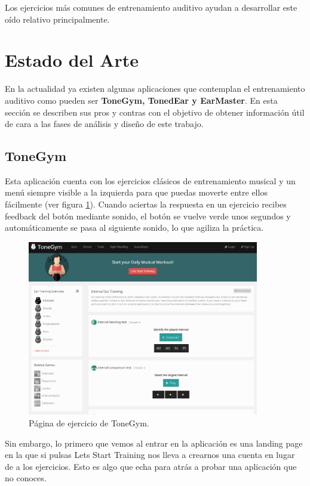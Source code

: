 \documentclass[12pt,twoside,titlepage]{report}
\begin{document}
Los ejercicios más comunes de entrenamiento auditivo ayudan a desarrollar este oído relativo principalmente.

\section{Estado del Arte}

En la actualidad ya existen algunas aplicaciones que contemplan el entrenamiento auditivo como pueden ser \textbf{ToneGym, TonedEar y EarMaster}. En esta sección se describen sus pros y contras con el objetivo de obtener información útil de cara a las fases de análisis y diseño de este trabajo.

\subsection{ToneGym}

Esta aplicación cuenta con los ejercicios clásicos de entrenamiento musical y un menú siempre visible a la izquierda para que puedas moverte entre ellos fácilmente (ver figura \ref{fig:ToneGym}). Cuando aciertas la respuesta en un ejercicio recibes feedback del botón mediante sonido, el botón se vuelve verde unos segundos y automáticamente se pasa al siguiente sonido, lo que agiliza la práctica.

\begin{figure}[H] 
    \includegraphics[width=0.9\textwidth]{Estado del Arte/tonegym}
    \centering
    \caption{Página de ejercicio de ToneGym.}
    \label{fig:ToneGym}
\end{figure}

Sin embargo, lo primero que vemos al entrar en la aplicación es una landing page en la que si pulsas Lets Start Training nos lleva a crearnos una cuenta en lugar de a los ejercicios. Esto es algo que echa para atrás a probar una aplicación que no conoces. 
\end{document}
